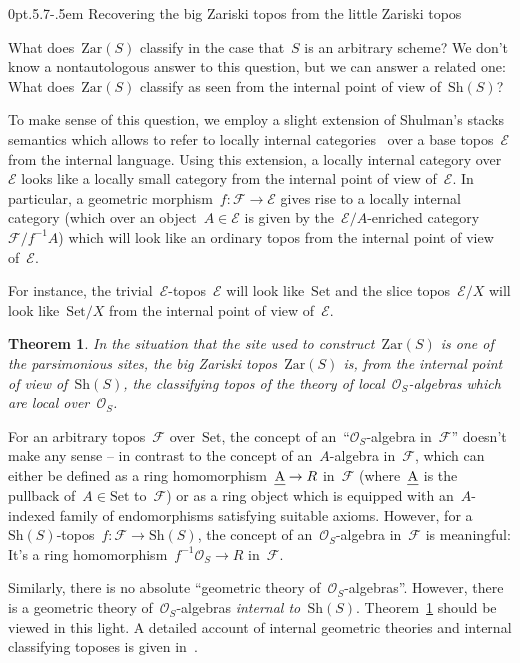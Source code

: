 \documentclass[10pt,reqno,a4paper]{amsbook}
\makeatletter
\theoremstyle{definition}
\theoremstyle{plain}
\newtheorem{thm}[defn]{Theorem}
\theoremstyle{remark}
\newcommand{\E}{\mathcal{E}}
\newcommand{\F}{\mathcal{F}}
\renewcommand{\O}{\mathcal{O}}
\let\oldul\ul
\renewcommand{\ul}[1]{\text{\oldul{$#1$}}}
\newcommand{\Set}{\mathrm{Set}}
\newcommand{\Sh}{\mathrm{Sh}}
\newcommand{\Zar}{\mathrm{Zar}}
\newcommand{\?}{\,{:}\,}
\renewcommand{\_}{\mathpunct{.}\,}
\def\subsection{\@startsection{subsection}{2}%
  {0pt}{.5\linespacing\@plus.7\linespacing}{-.5em}%
  {\normalfont\bfseries}}
\makeatother
\begin{document}
\subsection{Recovering the big Zariski topos from the little Zariski topos}

What does~$\Zar(S)$ classify in the case that~$S$ is an arbitrary scheme?
We don't know a nontautologous answer to this question, but we can answer a
related one: What does~$\Zar(S)$ classify as seen from the internal point of
view of~$\Sh(S)$?

To make sense of this question, we employ a slight extension of Shulman's
stacks semantics which allows to refer to locally internal
categories~\cite{penon:locally-internal-categories} over a base topos~$\E$ from
the internal language. Using this extension, a locally internal category
over~$\E$ looks like a locally small category from the internal point of view
of~$\E$. In particular, a geometric morphism~$f : \F \to \E$ gives rise to a
locally internal category (which over an object~$A \in \E$ is given by
the~$\E/A$-enriched category~$\F/f^{-1}A$) which will look like an ordinary
topos from the internal point of view of~$\E$.

For instance, the trivial~$\E$-topos~$\E$ will look like~$\Set$ and the
slice topos~$\E/X$ will look like~$\Set/X$ from the internal point of
view of~$\E$.

\begin{thm}\label{thm:zar-classifies}
In the situation that the site used to construct~$\Zar(S)$ is one of the
parsimonious sites, the big Zariski topos~$\Zar(S)$ is, from the internal point
of view of~$\Sh(S)$, the classifying topos of
the theory of local~$\O_S$-algebras which are local over~$\O_S$.
\end{thm}

For an arbitrary topos~$\F$ over~$\Set$, the concept of an~``$\O_S$-algebra
in~$\F$'' doesn't make any sense -- in contrast to the concept of
an~$A$-algebra in~$\F$, which can either be defined as a ring
homomorphism~$\ul{A} \to R$ in~$\F$ (where~$\ul{A}$ is the pullback of~$A \in
\Set$ to~$\F$) or as a ring object which is equipped with an~$A$-indexed family of
endomorphisms satisfying suitable axioms. However, for a~$\Sh(S)$-topos~$f : \F \to
\Sh(S)$, the concept of an~$\O_S$-algebra in~$\F$ is meaningful: It's a ring
homomorphism~$f^{-1}\O_S \to R$ in~$\F$.

Similarly, there is no absolute ``geometric theory of~$\O_S$-algebras''.
However, there is a geometric theory of~$\O_S$-algebras \emph{internal
to~$\Sh(S)$}. Theorem~\ref{thm:zar-classifies} should be viewed in this light.
A detailed account of internal geometric theories and internal classifying toposes
is given in~\cite[Chapter~II]{henry:classifying-topoi}.
\end{document}

